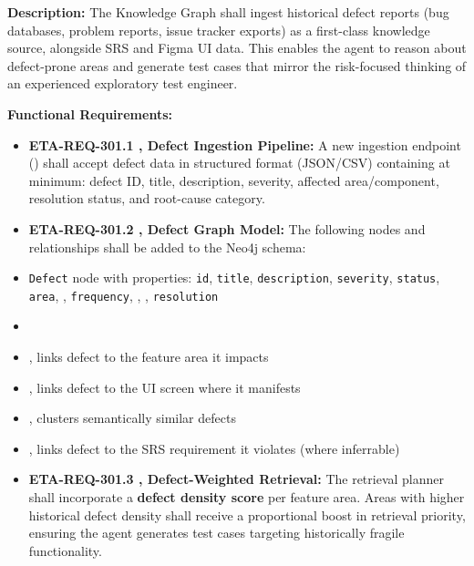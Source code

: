 \textbf{Description:}
The Knowledge Graph shall ingest historical defect reports (bug databases, problem reports, issue tracker exports) as a first-class knowledge source, alongside SRS and Figma UI data. This enables the agent to reason about defect-prone areas and generate test cases that mirror the risk-focused thinking of an experienced exploratory test engineer.

\textbf{Functional Requirements:}

\begin{itemize}[leftmargin=1.4em,itemsep=1pt,topsep=3pt]
  \item \textbf{ETA-REQ-301.1 ,  Defect Ingestion Pipeline:} A new ingestion endpoint () shall accept defect data in structured format (JSON/CSV) containing at minimum: defect ID, title, description, severity, affected area/component, resolution status, and root-cause category.
\end{itemize}

\begin{itemize}[leftmargin=1.4em,itemsep=1pt,topsep=3pt]
  \item \textbf{ETA-REQ-301.2 ,  Defect Graph Model:} The following nodes and relationships shall be added to the Neo4j schema:
  \item \texttt{Defect} node with properties: \texttt{id}, \texttt{title}, \texttt{description}, \texttt{severity}, \texttt{status}, \texttt{area}, , \texttt{frequency}, , , \texttt{resolution}
  \item {}
  \item {} ,  links defect to the feature area it impacts
  \item {} ,  links defect to the UI screen where it manifests
  \item {} ,  clusters semantically similar defects
  \item {} ,  links defect to the SRS requirement it violates (where inferrable)
\end{itemize}

\begin{itemize}[leftmargin=1.4em,itemsep=1pt,topsep=3pt]
  \item \textbf{ETA-REQ-301.3 ,  Defect-Weighted Retrieval:} The retrieval planner shall incorporate a \textbf{defect density score} per feature area. Areas with higher historical defect density shall receive a proportional boost in retrieval priority, ensuring the agent generates test cases targeting historically fragile functionality.
\end{itemize}

